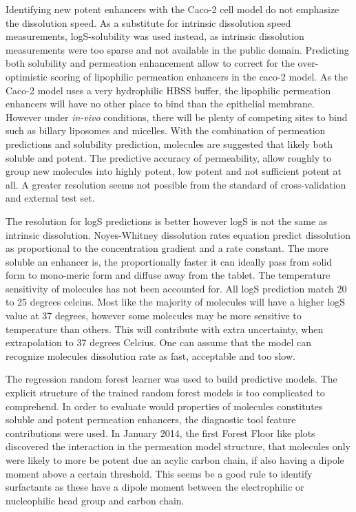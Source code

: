 Identifying new potent enhancers with the Caco-2 cell model do not emphasize the dissolution speed. As a substitute for intrinsic dissolution speed measurements, logS-solubility was used instead, as intrinsic dissolution measurements were too sparse and not available in the public domain. Predicting both solubility and permeation enhancement allow to correct for the over-optimistic scoring of lipophilic permeation enhancers in the caco-2 model. As the Caco-2 model uses a very hydrophilic HBSS buffer, the lipophilic permeation enhancers will have no other place to bind than the epithelial membrane. However under \textit{in-vivo} conditions, there will be plenty of competing sites to bind such as billary liposomes and micelles. With the combination of permeation predictions and solubility prediction, molecules are suggested that likely both soluble and potent. The predictive accuracy of permeability, allow roughly to group new molecules into highly potent, low potent and not sufficient potent at all. A greater resolution seems not possible from the standard of cross-validation and external test set.

The resolution for logS predictions is better however logS is not the same as intrinsic dissolution. Noyes-Whitney dissolution rates equation predict dissolution as proportional to the concentration gradient and a rate constant. The more soluble an enhancer is, the proportionally faster it can ideally pass from solid form to mono-meric form and diffuse away from the tablet. The temperature sensitivity of molecules has not been accounted for. All logS prediction match 20 to 25 degrees celcius. Most like the majority of molecules will have a higher logS value at 37 degrees, however some molecules may be more sensitive to temperature than others. This will contribute with extra uncertainty, when extrapolation to 37 degrees Celcius. One can assume that the model can recognize molecules dissolution rate as fast, acceptable and too slow.

The regression random forest learner was used to build predictive models. The explicit structure of the trained random forest models is too complicated to comprehend. In order to evaluate would properties of molecules constitutes soluble and potent permeation enhancers, the diagnostic tool feature contributions were used. In January 2014, the first Forest Floor like plots discovered the interaction in the permeation model structure, that molecules only were likely to more be potent due an acylic carbon chain, if also having a dipole moment above a certain threshold. This seems be a good rule to identify surfactants as these have a dipole moment between the electrophilic or nucleophilic head group and carbon chain.

